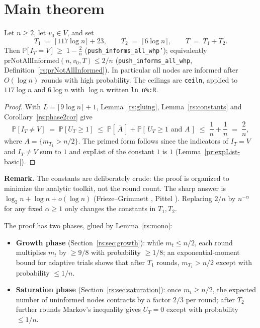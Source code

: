 \section{Main theorem}\label{rs:sec:main-statement}

\begin{theorem}
  \label{rs:main}
  \rocqok
  Let $n \ge 2$, let $v_0 \in V$, and set
  \[
    T_1 \;=\; \lceil 117 \log n \rceil + 23, \qquad
    T_2 \;=\; \lceil 6 \log n \rceil, \qquad
    T \;=\; T_1 + T_2 .
  \]
  Then $\mathbb{P}\bigl[\, I_T = V \,\bigr] \;\ge\; 1 - \frac{2}{n}$
  (\texttt{push\_informs\_all\_whp'}); equivalently
  $\mathrm{prNotAllInformed}(n, v_0, T) \le 2/n$
  (\texttt{push\_informs\_all\_whp}, Definition~\ref{rs:prNotAllInformed}).
  In particular all nodes are informed after $O(\log n)$ rounds with high
  probability. The ceilings are \texttt{ceiln}, applied to
  $117 \log n$ and $6 \log n$ with $\log n$ written \texttt{ln n\%:R}.
\end{theorem}
\begin{proof}
  \rocqok
  With $L = \lceil 9\log n \rceil + 1$, Lemma~\ref{rs:gluing},
  Lemma~\ref{rs:constants} and Corollary~\ref{rs:phase2cor} give
  \[
    \mathbb{P}[I_T \ne V] \;=\; \mathbb{P}[U_T \ge 1]
    \;\le\; \mathbb{P}[\,\overline{A}\,]
      + \mathbb{P}[\,U_T \ge 1 \text{ and } A\,]
    \;\le\; \frac1n + \frac1n \;=\; \frac2n ,
  \]
  where $A = \{m_{T_1} > n/2\}$. The primed form follows since the
  indicators of $I_T = V$ and $I_T \ne V$ sum to $1$ and
  $\mathrm{expList}$ of the constant $1$ is $1$
  (Lemma~\ref{pr:expList-basic}).
\end{proof}

\noindent\textbf{Remark.}
  The constants are deliberately crude: the proof is organized to minimize
  the analytic toolkit, not the round count. The sharp answer is
  $\log_2 n + \log n + o(\log n)$ (Frieze--Grimmett \cite{FG85}, Pittel
  \cite{Pittel87}). Replacing $2/n$ by $n^{-\alpha}$ for any fixed
  $\alpha \ge 1$ only changes the constants in $T_1, T_2$.

The proof has two phases, glued by Lemma~\ref{rs:mono}:
\begin{itemize}
\item \textbf{Growth phase} (Section~\ref{rs:sec:growth}): while $m_t \le n/2$,
  each round multiplies $m_t$ by $\ge 9/8$ with probability $\ge 1/8$;
  an exponential-moment bound for adaptive trials shows that after $T_1$
  rounds, $m_{T_1} > n/2$ except with probability $\le 1/n$.
\item \textbf{Saturation phase} (Section~\ref{rs:sec:saturation}): once
  $m_t \ge n/2$, the expected number of uninformed nodes contracts by a
  factor $2/3$ per round; after $T_2$ further rounds Markov's inequality
  gives $U_T = 0$ except with probability $\le 1/n$.
\end{itemize}

